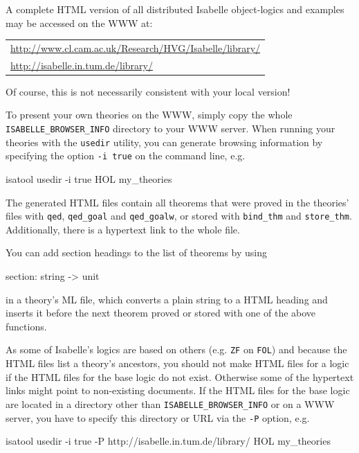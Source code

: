 A complete HTML version of all distributed Isabelle object-logics and
examples may be accessed on the WWW at:

\begin{center}\small
  \begin{tabular}{l}
    \url{http://www.cl.cam.ac.uk/Research/HVG/Isabelle/library/} \\
    \url{http://isabelle.in.tum.de/library/} \\
  \end{tabular}
\end{center}

Of course, this is not necessarily consistent with your local version!

\medskip
To present your own theories on the WWW, simply copy the whole
\texttt{ISABELLE_BROWSER_INFO} directory to your WWW server.
When running your theories with the \texttt{usedir} utility, you can
generate browsing information by specifying the option \texttt{-i true}
on the command line, e.g.
\begin{ttbox}
isatool usedir -i true HOL my_theories
\end{ttbox}

The generated HTML files contain all theorems that were
proved in the theories' \ML{} files with {\tt qed}, {\tt qed_goal} and
{\tt qed_goalw}, or stored with {\tt bind_thm} and {\tt store_thm}.
Additionally, there is a hypertext link to the whole \ML{} file.

You can add section headings to the list of theorems by using

\begin{ttbox}
section: string -> unit
\end{ttbox}

in a theory's ML file, which converts a plain string to a HTML heading
and inserts it before the next theorem proved or stored with one of
the above functions.

As some of Isabelle's logics are based on others (e.g. {\tt ZF}
on {\tt FOL}) and because the HTML files list a theory's
ancestors, you should not make HTML files for a logic if the HTML
files for the base logic do not exist. Otherwise some of the hypertext
links might point to non-existing documents. If the HTML files for the
base logic are located in a directory other than \texttt{ISABELLE_BROWSER_INFO}
or on a WWW server, you have to specify this directory or URL via
the \texttt{-P} option, e.g.
\begin{ttbox}
isatool usedir -i true
  -P http://isabelle.in.tum.de/library/ HOL my_theories
\end{ttbox}

